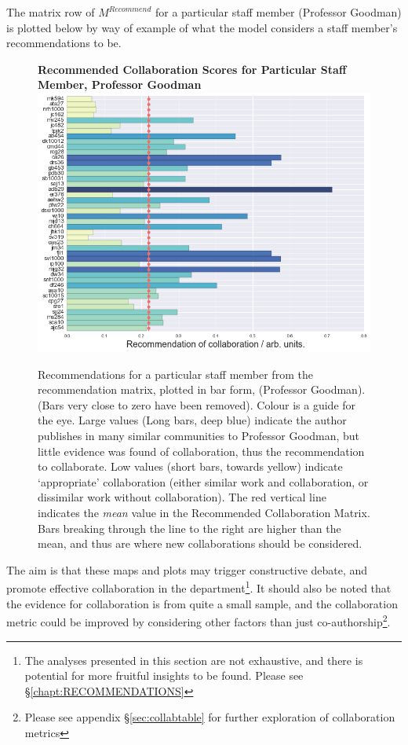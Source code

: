 The matrix row of $M^{Recommend}$ for a particular staff member (Professor Goodman) is plotted below by way of example of what the model considers a staff member's recommendations to be.
\begin{center}
\begin{figure}[H]
  \centering
  \textbf{Recommended Collaboration Scores for Particular Staff Member, Professor Goodman}
    \includegraphics[width=\textwidth]{Analysis/jmg_dots_line.png}
    \caption[Recommended Collaboration Scores for Particular Staff Member]{Recommendations for a particular staff member from the recommendation matrix, plotted in bar form, (Professor Goodman). (Bars very close to zero have been removed). Colour is a guide for the eye. Large values (Long bars, deep blue) indicate the author publishes in many similar communities to Professor Goodman, but little evidence was found of collaboration, thus the recommendation to collaborate. Low values (short bars, towards yellow) indicate `appropriate' collaboration (either similar work and collaboration, or dissimilar work without collaboration). The red vertical line indicates the \emph{mean} value in the Recommended Collaboration Matrix. Bars breaking through the line to the right are higher than the mean, and thus are where new collaborations should be considered.}
    \label{fig:RECOMM_BAR}
\end{figure} 
\end{center}
The aim is that these maps and plots may trigger constructive debate, and promote effective collaboration in the department\footnote{The analyses presented in this section are not exhaustive, and there is potential for more fruitful insights to be found. Please see \S\ref{chapt:RECOMMENDATIONS}}. It should also be noted that the evidence for collaboration is from quite a small sample, and the collaboration metric could be improved by considering other factors than just co-authorship\footnote{Please see appendix \S\ref{sec:collabtable} for further exploration of collaboration metrics}.

